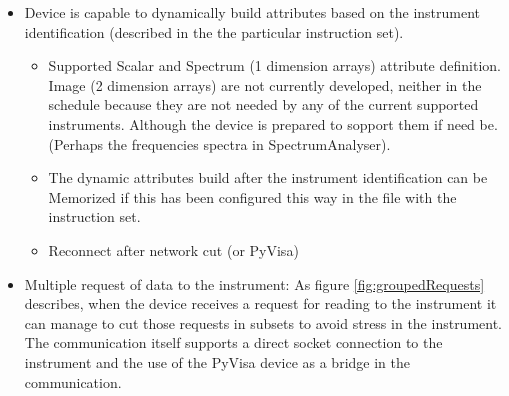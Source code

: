 \documentclass[a4paper,10pt]{article}
\begin{document}
\begin{itemize}
    \item Device is capable to dynamically build attributes based on the instrument identification (described in the the particular instruction set).
    \begin{itemize}
        \item Supported Scalar and Spectrum (1 dimension arrays) attribute definition. Image (2 dimension arrays) are not currently developed, neither in the schedule because they are not needed by any of the current supported instruments. Although the device is prepared to sopport them if need be. (Perhaps the frequencies spectra in SpectrumAnalyser).
        \item The dynamic attributes build after the instrument identification can be Memorized if this has been configured this way in the file with the instruction set.
        \item Reconnect after network cut (or PyVisa)
    \end{itemize}
    \item Multiple request of data to the instrument: As figure \ref{fig:groupedRequests} describes, when the device receives a request for reading to the instrument it can manage to cut those requests in subsets to avoid stress in the instrument. The communication itself supports a direct socket connection to the instrument and the use of the PyVisa device as a bridge in the communication.
\end{itemize}

\begin{figure}[h]
\end{figure}
\end{document}
